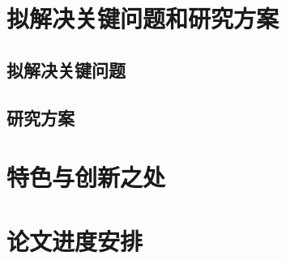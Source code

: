 \documentclass[hyperref,UTF8]{ctexart}
\begin{document}
\section{拟解决关键问题和研究方案}
\subsection{拟解决关键问题}
\subsection{研究方案}

\section{特色与创新之处}

\section{论文进度安排}




\clearpage
{}										%



\end{document}
